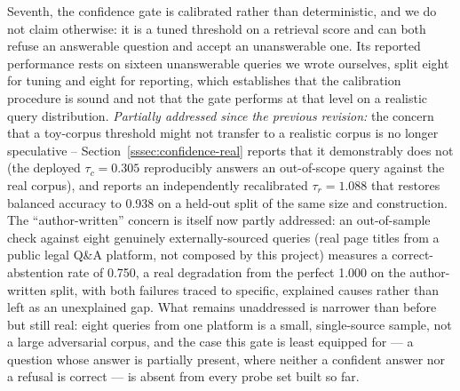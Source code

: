 \documentclass[conference]{IEEEtran}
\begin{document}
Seventh, the confidence gate is calibrated rather than deterministic, and we do not claim otherwise: it is a tuned threshold on a retrieval score and can both refuse an answerable question and accept an unanswerable one. Its reported performance rests on sixteen unanswerable queries we wrote ourselves, split eight for tuning and eight for reporting, which establishes that the calibration procedure is sound and not that the gate performs at that level on a realistic query distribution. \emph{Partially addressed since the previous revision:} the concern that a toy-corpus threshold might not transfer to a realistic corpus is no longer speculative -- Section~\ref{sssec:confidence-real} reports that it demonstrably does not (the deployed $\tau_c=0.305$ reproducibly answers an out-of-scope query against the real corpus), and reports an independently recalibrated $\tau_r=1.088$ that restores balanced accuracy to 0.938 on a held-out split of the same size and construction. The ``author-written'' concern is itself now partly addressed: an out-of-sample check against eight genuinely externally-sourced queries (real page titles from a public legal Q\&A platform, not composed by this project) measures a correct-abstention rate of 0.750, a real degradation from the perfect 1.000 on the author-written split, with both failures traced to specific, explained causes rather than left as an unexplained gap. What remains unaddressed is narrower than before but still real: eight queries from one platform is a small, single-source sample, not a large adversarial corpus, and the case this gate is least equipped for --- a question whose answer is partially present, where neither a confident answer nor a refusal is correct --- is absent from every probe set built so far.
\end{document}
